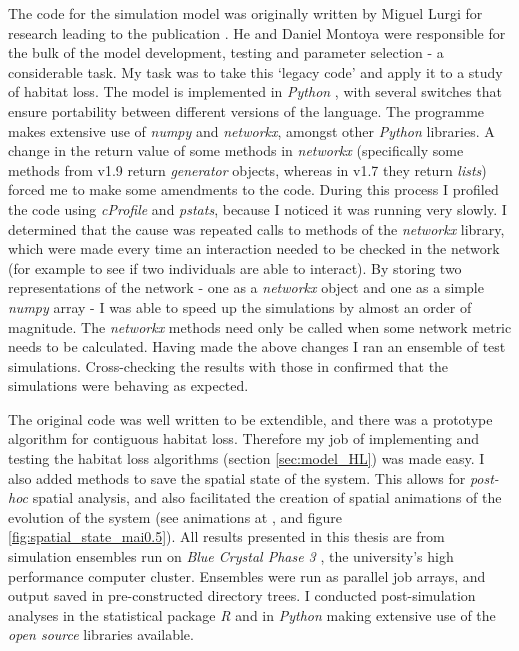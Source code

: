 The code for the simulation model was originally written by Miguel Lurgi for research leading to the publication \cite{lurgi2015effects}. He and Daniel Montoya were responsible for the bulk of the model development, testing and parameter selection - a considerable task. My task was to take this `legacy code' and apply it to a study of habitat loss. The model is implemented in \emph{Python} \cite{python}, with several switches that ensure portability between different versions of the language. The programme makes extensive use of \emph{numpy} and \emph{networkx}, amongst other \emph{Python} libraries. A change in the return value of some methods in \emph{networkx} (specifically some methods from v1.9 return \emph{generator} objects, whereas in v1.7 they return \emph{lists}) forced me to make some amendments to the code. During this process I profiled the code using \emph{cProfile} and \emph{pstats}, because I noticed it was running very slowly. I determined that the cause was repeated calls to methods of the \emph{networkx} library, which were made every time an interaction needed to be checked in the network (for example to see if two individuals are able to interact). By storing two representations of the network - one as a \emph{networkx} object and one as a simple \emph{numpy} array - I was able to speed up the simulations by almost an order of magnitude. The \emph{networkx} methods need only be called when some network metric needs to be calculated. Having made the above changes I ran an ensemble of test simulations. Cross-checking the results with those in \cite{lurgi2015effects} confirmed that the simulations were behaving as expected.    

The original code was well written to be extendible, and there was a prototype algorithm for contiguous habitat loss. Therefore my job of implementing and testing the habitat loss algorithms (section \ref{sec:model_HL}) was made easy. I also added methods to save the spatial state of the system. This allows for \emph{post-hoc} spatial analysis, and also facilitated the creation of spatial animations of the evolution of the system (see animations at \cite{mcwilliams2015anim}, and figure \ref{fig:spatial_state_mai0.5}). All results presented in this thesis are from simulation ensembles run on \emph{Blue Crystal Phase 3} \cite{BC3}, the university's high performance computer cluster. Ensembles were run as parallel job arrays, and output saved in pre-constructed directory trees. I conducted post-simulation analyses in the statistical package \emph{R} \cite{Rlanguage} and in \emph{Python} making extensive use of the \emph{open source} libraries available.


